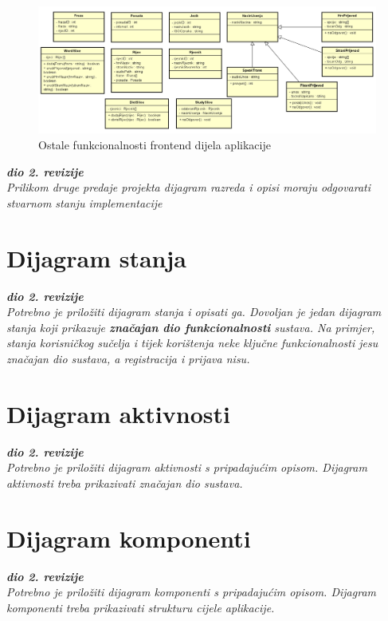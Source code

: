 \begin{figure}[htp]
	\includegraphics[scale=0.5]{dijagrami/class_front.png}
	\centering
	\caption{Ostale funkcionalnosti frontend dijela aplikacije}
	\label{fig:class-front}
\end{figure}

\eject

			
			\textbf{\textit{dio 2. revizije}}\\			
			
			\textit{Prilikom druge predaje projekta dijagram razreda i opisi moraju odgovarati stvarnom stanju implementacije}
			
			
			
			\eject
		
		\section{Dijagram stanja}
			
			
			\textbf{\textit{dio 2. revizije}}\\
			
			\textit{Potrebno je priložiti dijagram stanja i opisati ga. Dovoljan je jedan dijagram stanja koji prikazuje \textbf{značajan dio funkcionalnosti} sustava. Na primjer, stanja korisničkog sučelja i tijek korištenja neke ključne funkcionalnosti jesu značajan dio sustava, a registracija i prijava nisu. }
			
			
			\eject 
		
		\section{Dijagram aktivnosti}
			
			\textbf{\textit{dio 2. revizije}}\\
			
			 \textit{Potrebno je priložiti dijagram aktivnosti s pripadajućim opisom. Dijagram aktivnosti treba prikazivati značajan dio sustava.}
			
			\eject
		\section{Dijagram komponenti}
		
			\textbf{\textit{dio 2. revizije}}\\
		
			 \textit{Potrebno je priložiti dijagram komponenti s pripadajućim opisom. Dijagram komponenti treba prikazivati strukturu cijele aplikacije.}